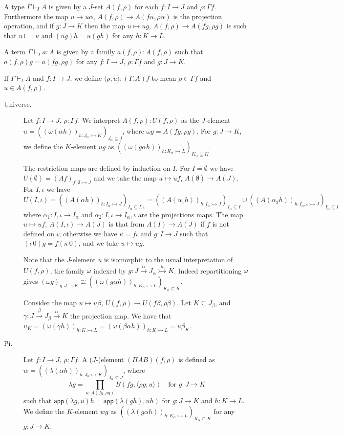 \documentclass[english]{PaperTools/latex/lipics}
\def\app#1#2{\mathsf{app}(#1,#2)}
\begin{document}
\medskip
A type $Γ ⊢_I A$ is given by a $J$-set $A(f,ρ)$ for each $f : I → J$ and
$ρ : Γf$.
Furthermore the map $u ↦ uα$, $A(f,ρ) → A(fα,ρα)$ is the projection operation,
and if $g : J → K$ then the map $u ↦ ug$, $A(f,ρ) → A(fg,ρg)$ is such that
$u1 = u$ and $(ug)h = u(gh)$ for any $h : K → L$.

\medskip
A term $Γ ⊢_I a : A$ is given by a family $a(f,ρ) : A(f,ρ)$ such that
$a(f,ρ)g = a(fg,ρg)$ for any $f : I → J$, $ρ : Γf$ and $g : J → K$.

\medskip
If $Γ ⊢_I A$ and $f : I → J$, we define $⟨ρ,u⟩ : (Γ.A)f$ to mean
$ρ ∈ Γf$ and $u ∈ A(f,ρ)$.


\bigskip
\begin{description}
  \item[\sc Universe.]
    Let $f : I → J$, $ρ : Γf$.  We interpret $A(f,ρ) : U(f,ρ)$ as the
    $J$-element $u = \left(\left(ω(αh)\right)_{h : J_α ↣ K}\right)_{J_α ⊆ J}$,
    where $ωg = A(fg,ρg)$.
    For $g : J → K$, we define the $K$-element $u g$ as
    $\left(\left(ω(gαh)\right)_{h : K_α ↣ L}\right)_{K_α ⊆ K}$.

    The restriction maps are defined by induction on $I$.
    For $I = ∅$ we have $U(∅) = (Af)_{f:∅ ↣ J}$ and we take the map
    $u ↦ uf$, $A(∅) → A(J)$.
    For $I,ι$ we have $U(I,ι) = \left(\left(A(αh)\right)_{h : I_α ↣ J}\right)_{I_α ⊆ I,ι}
    = \left(\left(A(α_1h)\right)_{h : I_α ↣ J}\right)_{I_α ⊆ I} ∪
      \left(\left(A(α_2h)\right)_{h : I_α,ι ↣ J}\right)_{I_α ⊆ I}$
    where $α_1 : I,ι → I_α$ and $α_2 : I,ι → I_α,ι$ are the projections
    maps.
    The map $u ↦ uf$, $A(I,ι) → A(J)$ is
    that from $A(I) → A(J)$ if $f$ is not defined on $ι$; otherwise
    we have $κ = fι$ and $g : I→J$ such that $(ι\,0)g = f(κ\,0)$, and we
    take $u ↦ ug$.

    Note that the $J$-element $u$ is isomorphic to the usual interpretation of
    $U(f,ρ)$, the family $ω$ indexed by $g : J \stackrel{α}{→} J_α \stackrel {h}{↣} K$.
    Indeed repartitioning $ω$ gives
    $\left(ωg\right)_{g : J → K} ≅ \left(\left(ω(gαh)\right)_{h : K_α ↣ L}\right)_{K_α ⊆ K}$.

    Consider the map $u ↦ uβ$, $U(f,ρ) → U(fβ,ρβ)$.  Let
    $K ⊆ J_β$, and $γ : J \stackrel{β}{→} J_β \stackrel{α}{→} K$ the projection map.
    We have that
    $u_K = \left(ω(γh)\right)_{h : K ↣ L}
         = \left(ω(βαh)\right)_{h : K ↣ L}
         = uβ_K$.

  \item[\sc Pi.]
    Let $f : I → J$, $ρ : Γf$.  A ($J$-)element $(Π A B)(f,ρ)$ is defined as
    $w = \left(\left(λ(αh)\right)_{h : J_α ↣ K}\right)_{J_α ⊆ J}$,
    where
    $$λ g = \prod_{u : A(fg,ρg)} B(fg,⟨ρg,u⟩) \quad\text{for $g : J → K$}$$
    such that
    $\app{λg} u h = \app{λ(gh)}{uh}$ for $g : J → K$ and $h : K → L$.
    We define the $K$-element $w g$ as
    $\left(\left(λ(gαh)\right)_{h : K_α ↣ L}\right)_{K_α ⊆ K}$ for any $g : J → K$.


\end{description}
\end{document}
